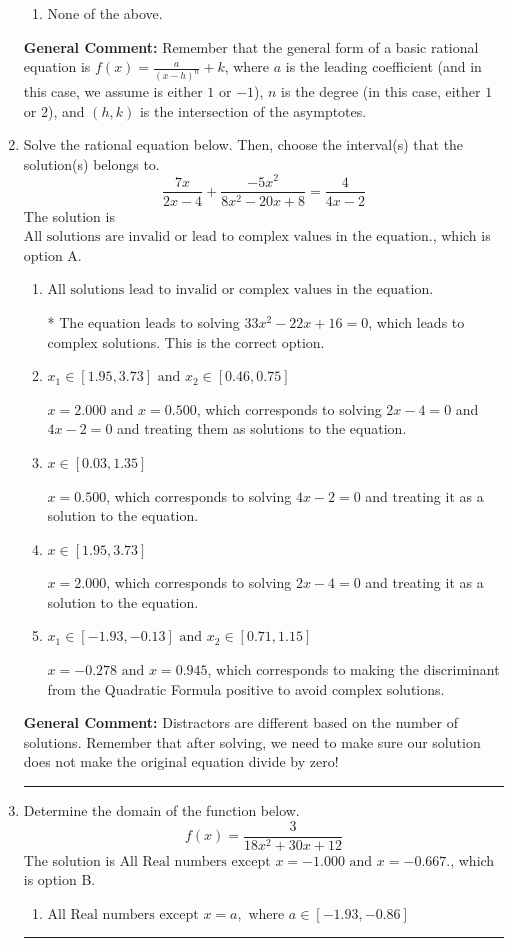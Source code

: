 \documentclass{extbook}[14pt]
\newcommand{\litem}[1]{\item #1

\rule{\textwidth}{0.4pt}}
\begin{document}
\begin{enumerate}
{\begin{enumerate}[label=\Alph*.]
\begin{multicols}{2}
\end{multicols}\item None of the above.\end{enumerate}
\textbf{General Comment:} Remember that the general form of a basic rational equation is $ f(x) = \frac{a}{(x-h)^n} + k$, where $a$ is the leading coefficient (and in this case, we assume is either $1$ or $-1$), $n$ is the degree (in this case, either $1$ or $2$), and $(h, k)$ is the intersection of the asymptotes.
}
\litem{
Solve the rational equation below. Then, choose the interval(s) that the solution(s) belongs to.
\[ \frac{7x}{2x -4} + \frac{-5x^{2}}{8x^{2} -20 x + 8} = \frac{4}{4x -2} \]The solution is \( \text{All solutions are invalid or lead to complex values in the equation.} \), which is option A.\begin{enumerate}[label=\Alph*.]
\item \( \text{All solutions lead to invalid or complex values in the equation.} \)

* The equation leads to solving $33x^{2} -22 x + 16=0$, which leads to complex solutions. This is the correct option.
\item \( x_1 \in [1.95, 3.73] \text{ and } x_2 \in [0.46,0.75] \)

$x = 2.000 \text{ and } x = 0.500$, which corresponds to solving $2x -4 = 0$ and $4x -2 = 0$ and treating them as solutions to the equation.
\item \( x \in [0.03,1.35] \)

$x = 0.500$, which corresponds to solving $4x -2 = 0$ and treating it as a solution to the equation.
\item \( x \in [1.95,3.73] \)

$x = 2.000$, which corresponds to solving $2x -4 = 0$ and treating it as a solution to the equation.
\item \( x_1 \in [-1.93, -0.13] \text{ and } x_2 \in [0.71,1.15] \)

$x = -0.278 \text{ and } x = 0.945$, which corresponds to making the discriminant from the Quadratic Formula positive to avoid complex solutions.
\end{enumerate}

\textbf{General Comment:} Distractors are different based on the number of solutions. Remember that after solving, we need to make sure our solution does not make the original equation divide by zero!
}
\litem{
Determine the domain of the function below.
\[ f(x) = \frac{3}{18x^{2} +30 x + 12} \]The solution is \( \text{All Real numbers except } x = -1.000 \text{ and } x = -0.667. \), which is option B.\begin{enumerate}[label=\Alph*.]
\item \( \text{All Real numbers except } x = a, \text{ where } a \in [-1.93, -0.86] \)


\end{enumerate}}
\end{enumerate}
\end{document}
